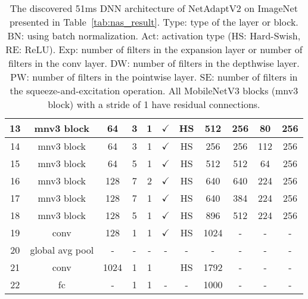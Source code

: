 \begin{table*}[t]
\begin{tabular}{c|c|c|c|c|c|c|c|c|c|c}
13    & mnv3 block      & 64   & 3                                                     & 1      & $\checkmark$ & HS  & 512  & 256  & 80   & 256 \\ \hline
14    & mnv3 block      & 64   & 3                                                     & 1      & $\checkmark$ & HS  & 256  & 256  & 112  & 256 \\ \hline
15    & mnv3 block      & 64   & 5                                                     & 1      & $\checkmark$ & HS  & 512  & 512  & 64   & 256 \\ \hline
16    & mnv3 block      & 128  & 7                                                     & 2      & $\checkmark$ & HS  & 640  & 640  & 224  & 256 \\ \hline
17    & mnv3 block      & 128  & 7                                                     & 1      & $\checkmark$ & HS  & 640  & 384  & 224  & 256 \\ \hline
18    & mnv3 block      & 128  & 5                                                     & 1      & $\checkmark$ & HS  & 896  & 512  & 224  & 256 \\ \hline
19    & conv            & 128  & 1                                                     & 1      & $\checkmark$ & HS  & 1024 & -    & -    & -   \\ \hline
20    & global avg pool & -    & -                                                     & -      & -            & -   & -    & -    & -    & -   \\ \hline
21    & conv            & 1024 & 1                                                     & 1      &              & HS  & 1792 & -    & -    & -   \\ \hline
22    & fc              & -    & 1                                                     & 1      & -            & -   & 1000 & -    & -    & -   \\ \toprule
\end{tabular}
\caption{The discovered 51ms DNN architecture of NetAdaptV2 on ImageNet presented in Table~\ref{tab:nas_result}. Type: type of the layer or block. BN: using batch normalization. Act: activation type (HS: Hard-Swish, RE: ReLU). Exp: number of filters in the expansion layer or number of filters in the conv layer. DW: number of filters in the depthwise layer. PW: number of filters in the pointwise layer. SE: number of filters in the squeeze-and-excitation operation. All MobileNetV3 blocks (mnv3 block) with a stride of 1 have residual connections.}
\label{tab:discovered_architecture}
\end{table*}

